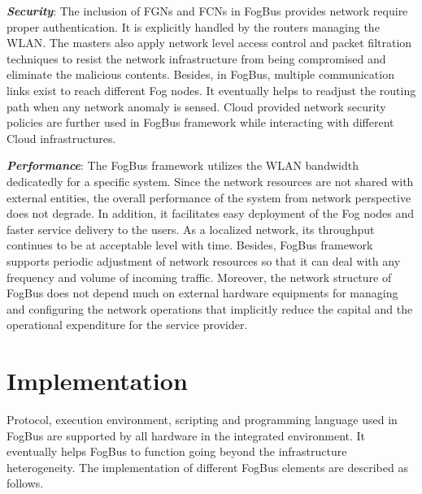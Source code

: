 \documentclass[final,5p,times,twocolumn]{elsarticle}
\begin{document}
%      
\par \textbf{\textit{Security}}: The inclusion of FGNs and FCNs in FogBus provides network require proper authentication. It is explicitly handled by the routers managing the WLAN. The masters also apply network level access control and packet filtration techniques to resist the network infrastructure from being compromised and eliminate the malicious contents. Besides, in FogBus, multiple communication links exist to reach different Fog nodes. It eventually helps to readjust the routing path when any network anomaly is sensed. Cloud provided network security policies are further used in FogBus framework while interacting with different Cloud infrastructures. 
%
\par \textbf{\textit{Performance}}: The FogBus framework utilizes the WLAN bandwidth dedicatedly for a specific system. Since the network resources are not shared with external entities, the overall performance of the system from network perspective does not degrade. In addition, it facilitates easy deployment of the Fog nodes and faster service delivery to the users. As a localized network, its throughput continues to be at acceptable level with time. Besides, FogBus framework supports periodic adjustment of network resources so that it can deal with any frequency and volume of incoming traffic. Moreover, the network structure of FogBus does not depend much on external hardware equipments for managing and configuring the network operations that implicitly reduce the capital and the operational expenditure for the service provider.    
%
\section{Implementation} \label{implementation}
Protocol, execution environment, scripting and programming language used in FogBus are supported by all hardware in the integrated environment. It eventually helps FogBus to function going beyond the infrastructure heterogeneity. The implementation of different FogBus elements are described as follows. 
%   
\end{document}

